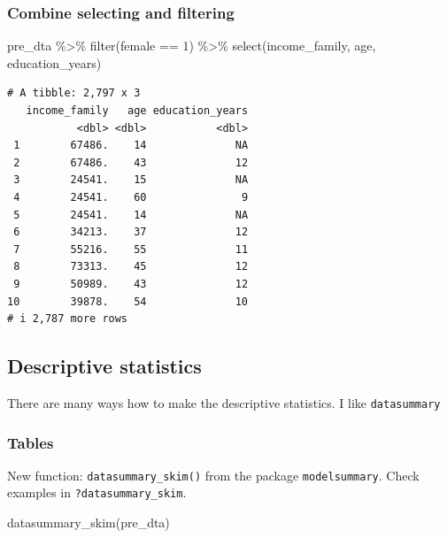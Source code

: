 \documentclass[
  letterpaper,
  DIV=11,
  numbers=noendperiod]{scrartcl}
\newenvironment{Shaded}{\begin{snugshade}}{\end{snugshade}}
\newcommand{\DecValTok}[1]{\textcolor[rgb]{0.68,0.00,0.00}{#1}}
\newcommand{\FunctionTok}[1]{\textcolor[rgb]{0.28,0.35,0.67}{#1}}
\newcommand{\NormalTok}[1]{\textcolor[rgb]{0.00,0.23,0.31}{#1}}
\newcommand{\SpecialCharTok}[1]{\textcolor[rgb]{0.37,0.37,0.37}{#1}}
\begin{document}
\hypertarget{combine-selecting-and-filtering}{%
\subsubsection{Combine selecting and
filtering}\label{combine-selecting-and-filtering}}

\begin{Shaded}
\begin{Highlighting}[]
\NormalTok{pre\_dta }\SpecialCharTok{\%\textgreater{}\%} 
  \FunctionTok{filter}\NormalTok{(female }\SpecialCharTok{==} \DecValTok{1}\NormalTok{) }\SpecialCharTok{\%\textgreater{}\%} 
  \FunctionTok{select}\NormalTok{(income\_family, age, education\_years)}
\end{Highlighting}
\end{Shaded}

\begin{verbatim}
# A tibble: 2,797 x 3
   income_family   age education_years
           <dbl> <dbl>           <dbl>
 1        67486.    14              NA
 2        67486.    43              12
 3        24541.    15              NA
 4        24541.    60               9
 5        24541.    14              NA
 6        34213.    37              12
 7        55216.    55              11
 8        73313.    45              12
 9        50989.    43              12
10        39878.    54              10
# i 2,787 more rows
\end{verbatim}

\hypertarget{descriptive-statistics}{%
\subsection{Descriptive statistics}\label{descriptive-statistics}}

There are many ways how to make the descriptive statistics. I like
\texttt{datasummary}

\hypertarget{tables}{%
\subsubsection{Tables}\label{tables}}

New function: \texttt{datasummary\_skim()} from the package
\texttt{modelsummary}. Check examples in \texttt{?datasummary\_skim}.

\begin{Shaded}
\begin{Highlighting}[]
\FunctionTok{datasummary\_skim}\NormalTok{(pre\_dta)}
\end{Highlighting}
\end{Shaded}
\end{document}
